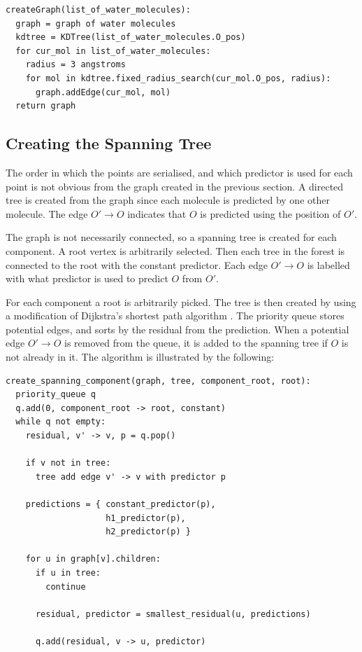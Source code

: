 \documentclass[a4paper]{report}
\begin{document}
\begin{verbatim}
createGraph(list_of_water_molecules):
  graph = graph of water molecules
  kdtree = KDTree(list_of_water_molecules.O_pos)
  for cur_mol in list_of_water_molecules:
    radius = 3 angstroms
    for mol in kdtree.fixed_radius_search(cur_mol.O_pos, radius):
      graph.addEdge(cur_mol, mol)
  return graph
\end{verbatim}



\subsection{Creating the Spanning Tree}

The order in which the points are serialised, and which predictor is used for
each point is not obvious from the graph created in the previous section. A
directed tree is created from the graph since each molecule is predicted by
one other molecule. The edge $O' \to O$ indicates that $O$ is predicted using
the position of $O'$.

The graph is not necessarily connected, so a spanning tree is created for each
component. A root vertex is arbitrarily selected. Then each tree in the forest
is connected to the root with the constant predictor. Each edge $O' \to O$ is
labelled with what predictor is used to predict $O$ from $O'$.

For each component a root is arbitrarily picked. The tree is then created by
using a modification of Dijkstra's shortest path algorithm
\citep{dijkstra1959note}. The priority queue stores potential edges, and sorts
by the residual from the prediction. When a potential edge $O' \to O$ is
removed from the queue, it is added to the spanning tree if $O$ is not already
in it. The algorithm is illustrated by the following:

\begin{verbatim}
create_spanning_component(graph, tree, component_root, root):
  priority_queue q
  q.add(0, component_root -> root, constant)
  while q not empty:
    residual, v' -> v, p = q.pop()

    if v not in tree:
      tree add edge v' -> v with predictor p

    predictions = { constant_predictor(p),
                    h1_predictor(p),
                    h2_predictor(p) }

    for u in graph[v].children:
      if u in tree:
        continue

      residual, predictor = smallest_residual(u, predictions)

      q.add(residual, v -> u, predictor)
\end{verbatim}
\end{document}
